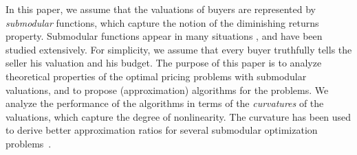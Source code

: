 \documentclass[letterpaper]{article}
\theoremstyle{definition}
\newcommand{\COMM}[2]{{
\begin{CJK}{UTF8}{ipxm}
\ifthenelse{\equal{#1}{TM}}{\color{blue}}{
\ifthenelse{\equal{#1}{YK}}{\color{red}}{
\ifthenelse{\equal{#1}{HS}}{\color{cyan}}{
\ifthenelse{\equal{#1}{KK}}{\color{magenta}}}}}
[#1: #2]
\end{CJK}
}}
\begin{document}

 
In this paper, we assume that the valuations of buyers are represented by \emph{submodular} functions, which capture the notion of the diminishing returns property. 
Submodular functions appear in many situations \cite{bach2010structured,SomaY15}, and have been studied extensively. 
For simplicity, %
we assume that every buyer truthfully tells the seller his valuation and his budget.
The purpose of this paper is to analyze theoretical properties of the optimal pricing problems with submodular valuations, and to propose (approximation) algorithms for the problems. 
We analyze the performance of the algorithms in terms of the \emph{curvatures} of the valuations, which capture the degree of nonlinearity.
The curvature has been used to derive better approximation ratios for several submodular optimization problems~\cite{iyer2013submodular,iyer2013curvature,sviridenko2015optimal,vondrak2010submodularity}. 
\end{document}
